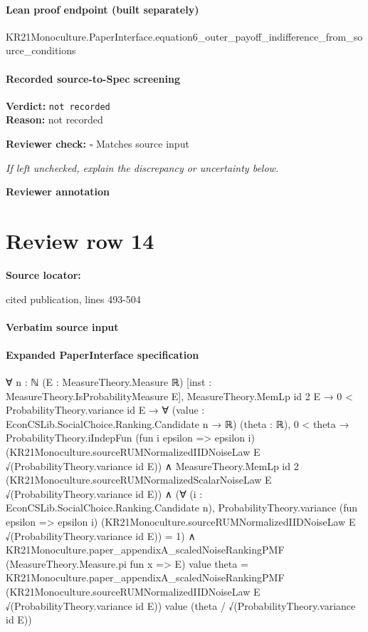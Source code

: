 \documentclass[10pt]{article}
\newcommand{\reviewerbox}{%
  \par\noindent\fbox{\parbox{0.96\linewidth}{\rule{0pt}{0.38in}}}\par
}
\newcommand{\reviewmatch}[1]{%
  \par\noindent\textbf{Reviewer check:} $\square$\; #1\par
  \noindent\emph{If left unchecked, explain the discrepancy or uncertainty below.}\par
}
\begin{document}
\paragraph{Lean proof endpoint (built separately)}\begin{ReviewVerbatim}
KR21Monoculture.PaperInterface.equation6_outer_payoff_indifference_from_source_conditions
\end{ReviewVerbatim}

\paragraph{Recorded source-to-Spec screening}
\textbf{Verdict:} \texttt{not recorded}
\\
\textbf{Reason:} not recorded
\reviewmatch{Matches source input}
\noindent\textbf{Reviewer annotation}\par
\reviewerbox
\clearpage
\hypertarget{source-claim-bd2d52e2663b165c}{}
\section*{Review row 14}
\textbf{Source locator:} {\footnotesize\raggedright cited publication, lines 493-\allowbreak{}504\par}
\paragraph{Verbatim source input}
\begin{ReviewVerbatim}
\end{ReviewVerbatim}


\paragraph{Expanded PaperInterface specification}
\begin{ReviewVerbatim}
∀ {n : ℕ} (E : MeasureTheory.Measure ℝ) [inst : MeasureTheory.IsProbabilityMeasure E],
  MeasureTheory.MemLp id 2 E →
    0 < ProbabilityTheory.variance id E →
      ∀ (value : EconCSLib.SocialChoice.Ranking.Candidate n → ℝ) (theta : ℝ),
        0 < theta →
          ProbabilityTheory.iIndepFun (fun i epsilon => epsilon i)
              (KR21Monoculture.sourceRUMNormalizedIIDNoiseLaw E √(ProbabilityTheory.variance id E)) ∧
            MeasureTheory.MemLp id 2
                (KR21Monoculture.sourceRUMNormalizedScalarNoiseLaw E √(ProbabilityTheory.variance id E)) ∧
              (∀ (i : EconCSLib.SocialChoice.Ranking.Candidate n),
                  ProbabilityTheory.variance (fun epsilon => epsilon i)
                      (KR21Monoculture.sourceRUMNormalizedIIDNoiseLaw E √(ProbabilityTheory.variance id E)) =
                    1) ∧
                KR21Monoculture.paper_appendixA_scaledNoiseRankingPMF (MeasureTheory.Measure.pi fun x => E) value
                    theta =
                  KR21Monoculture.paper_appendixA_scaledNoiseRankingPMF
                    (KR21Monoculture.sourceRUMNormalizedIIDNoiseLaw E √(ProbabilityTheory.variance id E)) value
                    (theta / √(ProbabilityTheory.variance id E))
\end{ReviewVerbatim}
\end{document}
